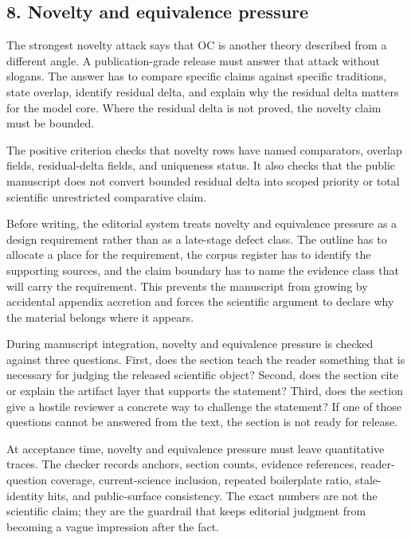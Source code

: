 \subsection{8. Novelty and equivalence pressure}

The strongest novelty attack says that OC is another theory described from a different angle. A publication-grade release must answer that attack without slogans. The answer has to compare specific claims against specific traditions, state overlap, identify residual delta, and explain why the residual delta matters for the model core. Where the residual delta is not proved, the novelty claim must be bounded.


The positive criterion checks that novelty rows have named comparators, overlap fields, residual-delta fields, and uniqueness status. It also checks that the public manuscript does not convert bounded residual delta into scoped priority or total scientific unrestricted comparative claim.


Before writing, the editorial system treats novelty and equivalence pressure as a design requirement rather than as a late-stage defect class. The outline has to allocate a place for the requirement, the corpus register has to identify the supporting sources, and the claim boundary has to name the evidence class that will carry the requirement. This prevents the manuscript from growing by accidental appendix accretion and forces the scientific argument to declare why the material belongs where it appears.


During manuscript integration, novelty and equivalence pressure is checked against three questions. First, does the section teach the reader something that is necessary for judging the released scientific object? Second, does the section cite or explain the artifact layer that supports the statement? Third, does the section give a hostile reviewer a concrete way to challenge the statement? If one of those questions cannot be answered from the text, the section is not ready for release.


At acceptance time, novelty and equivalence pressure must leave quantitative traces. The checker records anchors, section counts, evidence references, reader-question coverage, current-science inclusion, repeated boilerplate ratio, stale-identity hits, and public-surface consistency. The exact numbers are not the scientific claim; they are the guardrail that keeps editorial judgment from becoming a vague impression after the fact.


